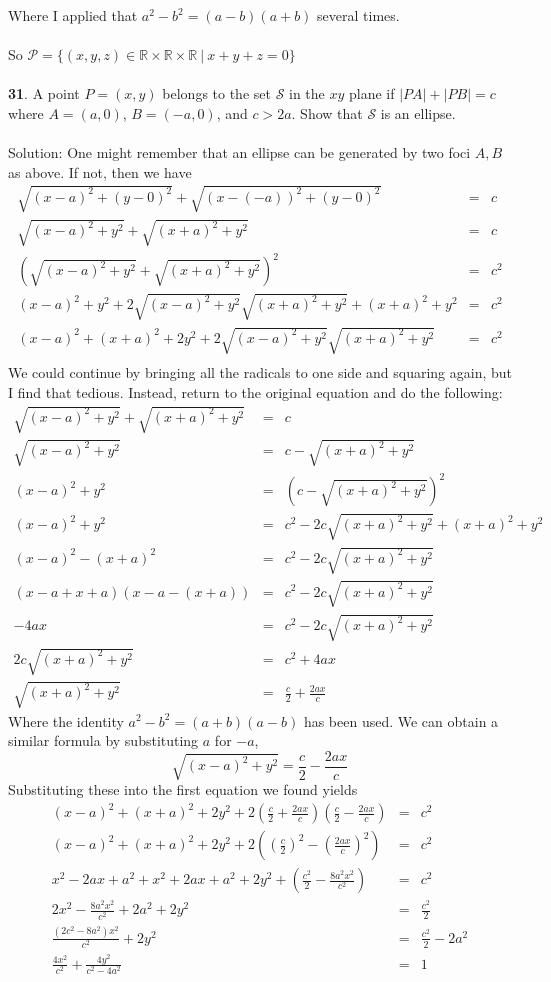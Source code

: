\documentclass[12pt]{amsbook}
\let\cal\mathcal
\begin{document}
Where I applied that $a^2-b^2=(a-b)(a+b)$ several times.
\\
\\
So $\mathcal{P}=\{(x,y,z) \in \mathbb{R} \times \mathbb{R} \times \mathbb{R}  \ | \ x+y+z=0\}$
\\
\\
{\small\bf 31}. A point $P=(x,y)$ belongs to the set ${\cal S}$
in the $xy$ plane if $|PA|+|PB|=c$ where $A=(a,0)$,
$B=(-a,0)$, and $c>2a$. Show that
${\cal S}$ is an ellipse.
\\
\\
{\sc Solution}: One might remember that an ellipse can be generated by two foci $A,B$ as above. If not, then we have
\begin{eqnarray*}
\sqrt{(x-a)^2+(y-0)^2}+\sqrt{(x-(-a))^2+(y-0)^2}&=&c\\
\sqrt{(x-a)^2+y^2}+\sqrt{(x+a)^2+y^2}&=&c\\
(\sqrt{(x-a)^2+y^2}+\sqrt{(x+a)^2+y^2})^2&=&c^2\\
(x-a)^2+y^2+2\sqrt{(x-a)^2+y^2}\sqrt{(x+a)^2+y^2}+(x+a)^2+y^2&=&c^2\\
(x-a)^2+(x+a)^2+2y^2+2\sqrt{(x-a)^2+y^2}\sqrt{(x+a)^2+y^2}&=&c^2\\
\end{eqnarray*}
We could continue by bringing all the radicals to one side and squaring again, but I find that tedious. Instead, return to the original equation and do the following:
\begin{eqnarray*}
\sqrt{(x-a)^2+y^2}+\sqrt{(x+a)^2+y^2}&=&c\\
\sqrt{(x-a)^2+y^2}&=&c-\sqrt{(x+a)^2+y^2}\\
(x-a)^2+y^2&=&(c-\sqrt{(x+a)^2+y^2})^2\\
(x-a)^2+y^2&=&c^2-2c\sqrt{(x+a)^2+y^2}+(x+a)^2+y^2\\
(x-a)^2-(x+a)^2&=&c^2-2c\sqrt{(x+a)^2+y^2}\\
(x-a+x+a)(x-a-(x+a))&=&c^2-2c\sqrt{(x+a)^2+y^2}\\
-4ax&=&c^2-2c\sqrt{(x+a)^2+y^2}\\
2c\sqrt{(x+a)^2+y^2}&=&c^2+4ax\\
\sqrt{(x+a)^2+y^2}&=&\frac{c}{2}+\frac{2ax}{c}
\end{eqnarray*}
Where the identity $a^2-b^2=(a+b)(a-b)$ has been used.
We can obtain a similar formula by substituting $a$ for $-a$, 
$$\sqrt{(x-a)^2+y^2}=\frac{c}{2}-\frac{2ax}{c}$$
Substituting these into the first equation we found yields
\begin{eqnarray*}
(x-a)^2+(x+a)^2+2y^2+2(\frac{c}{2}+\frac{2ax}{c})(\frac{c}{2}-\frac{2ax}{c})&=&c^2\\
(x-a)^2+(x+a)^2+2y^2+2((\frac{c}{2})^2-(\frac{2ax}{c})^2)&=&c^2\\
x^2-2ax+a^2+x^2+2ax+a^2+2y^2+(\frac{c^2}{2}-\frac{8a^2x^2}{c^2})&=&c^2\\
2x^2-\frac{8a^2x^2}{c^2}+2a^2+2y^2&=&\frac{c^2}{2}\\
\frac{(2c^2-8a^2)x^2}{c^2}+2y^2&=&\frac{c^2}{2}-2a^2\\
\frac{4x^2}{c^2}+\frac{4y^2}{c^2-4a^2}&=&1
\end{eqnarray*}
\end{document}

